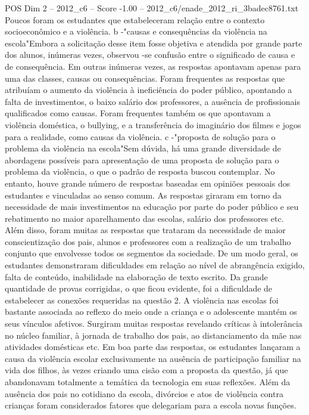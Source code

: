 \begin{textsample}{POS Dim 2 – 2012\_c6 – Score -1.00 – 2012\_c6/enade\_2012\_ri\_3badec8761.txt}
Poucos foram os estudantes que estabeleceram relação entre o contexto socioeconômico e a violência. b -"causas e consequências da violência na escola"Embora a solicitação desse item fosse objetiva e atendida por grande parte dos alunos, inúmeras vezes, observou -se confusão entre o significado de causa e de consequência.
Em outras inúmeras vezes, as respostas apontavam apenas para uma das classes, causas ou consequências.
Foram frequentes as respostas que atribuíam o aumento da violência à ineficiência do poder público, apontando a falta de investimentos, o baixo salário dos professores, a ausência de profissionais qualificados como causas.
Foram frequentes também os que apontavam a violência doméstica, o bullying, e a transferência do imaginário dos filmes e jogos para a realidade, como causas da violência. c -"proposta de solução para o problema da violência na escola"Sem dúvida, há uma grande diversidade de abordagens possíveis para apresentação de uma proposta de solução para o problema da violência, o que o padrão de resposta buscou contemplar.
No entanto, houve grande número de respostas baseadas em opiniões pessoais dos estudantes e vinculadas ao senso comum.
As respostas giraram em torno da necessidade de mais investimentos na educação por parte do poder público e seu rebatimento no maior aparelhamento das escolas, salário dos professores etc.
Além disso, foram muitas as respostas que trataram da necessidade de maior conscientização dos pais, alunos e professores com a realização de um trabalho conjunto que envolvesse todos os segmentos da sociedade.
De um modo geral, os estudantes demonstraram dificuldades em relação ao nível de abrangência exigido, falta de conteúdo, inabilidade na elaboração de texto escrito.
Da grande quantidade de provas corrigidas, o que ficou evidente, foi a dificuldade de estabelecer as conexões requeridas na questão 2.
A violência nas escolas foi bastante associada ao reflexo do meio onde a criança e o adolescente mantém os seus vínculos afetivos.
Surgiram muitas respostas revelando críticas à intolerância no núcleo familiar, à jornada de trabalho dos pais, ao distanciamento da mãe nas atividades domésticas etc.
Em boa parte das respostas, os estudantes lançaram a causa da violência escolar exclusivamente na ausência de participação familiar na vida dos filhos, às vezes criando uma cisão com a proposta da questão, já que abandonavam totalmente a temática da tecnologia em suas reflexões.
Além da ausência dos pais no cotidiano da escola, divórcios e atos de violência contra crianças foram considerados fatores que delegariam para a escola novas funções.

\end{textsample}
